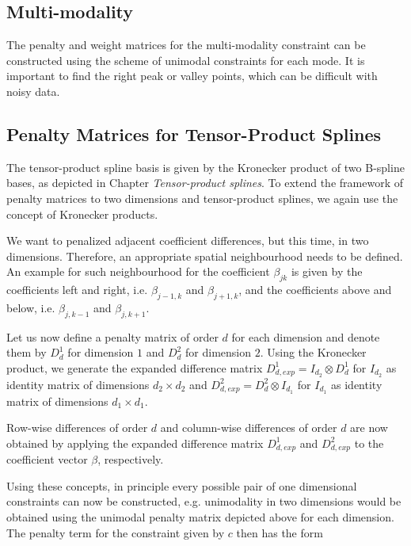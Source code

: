 \documentclass[10pt,a4paper]{article}
\begin{document}
	\subsection{Multi-modality} 
	
	The penalty and weight matrices for the multi-modality constraint can be constructed using the scheme of unimodal constraints for each mode. It is important to find the right peak or valley points, which can be difficult with noisy data. 
	
	\subsection{Penalty Matrices for Tensor-Product Splines}
	
	The tensor-product spline basis is given by the Kronecker product of two B-spline bases, as depicted in Chapter \emph{Tensor-product splines}. To extend the framework of penalty matrices to two dimensions and tensor-product splines, we again use the concept of Kronecker products. 
	
	We want to penalized adjacent coefficient differences, but this time, in two dimensions. Therefore, an appropriate spatial neighbourhood needs to be defined. An example for such neighbourhood for the coefficient $\beta_{jk}$ is given by the coefficients left and right, i.e. $\beta_{j-1, k}$ and $\beta_{j+1, k}$, and the coefficients above and below, i.e. $\beta_{j, k-1}$ and $\beta_{j,k+1}$. 
	
	Let us now define a penalty matrix of order $d$ for each dimension and denote them by $D^1_d$ for dimension $1$ and $D^2_d$ for dimension $2$. Using the Kronecker product, we generate the expanded difference matrix $D_{d, exp}^1 = I_{d_2} \otimes D^1_d$ for $I_{d_2}$ as identity matrix of dimensions $d_2 \times d_2$ and $D_{d,exp}^2 = D^2_d \otimes I_{d_1}$ for $I_{d_1}$ as identity matrix of dimensions $d_1 \times d_1$. 
	
	Row-wise differences of order $d$ and column-wise differences of order $d$ are now obtained by applying the expanded difference matrix $D_{d,exp}^1$ and $D_{d,exp}^2$ to the coefficient vector $\beta$, respectively. 
	
	Using these concepts, in principle every possible pair of one dimensional constraints can now be constructed, e.g. unimodality in two dimensions would be obtained using the unimodal penalty matrix depicted above for each dimension. The penalty term for the constraint given by $c$ then has the form
	
\end{document}
